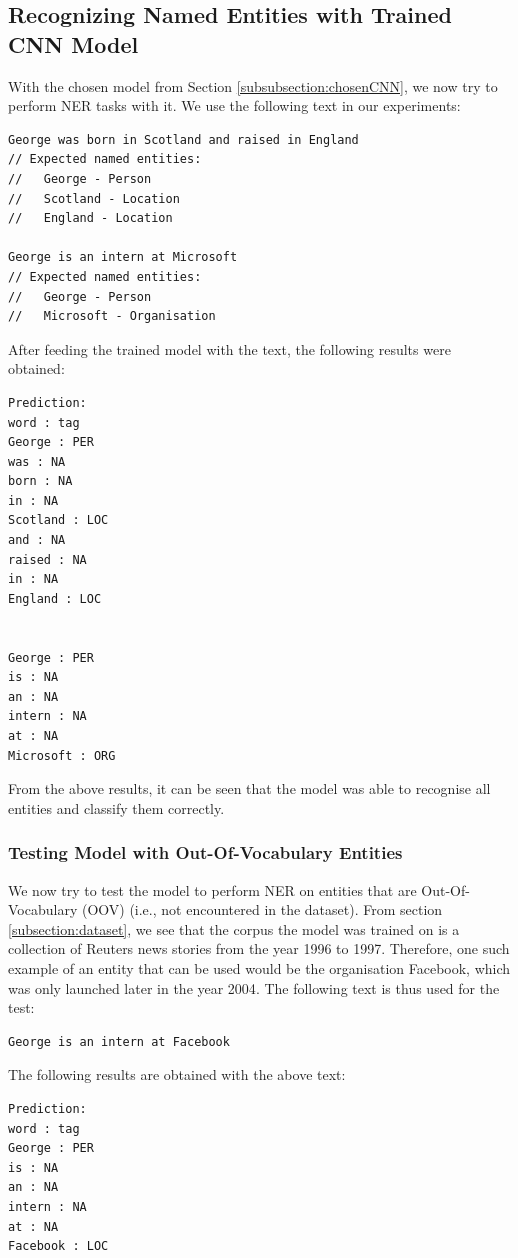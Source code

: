 \documentclass[sigconf,nonacm=true]{acmart}
\begin{document}
\subsection{Recognizing Named Entities with Trained CNN Model}
With the chosen model from Section \ref{subsubsection:chosenCNN}, we now try to perform NER tasks with it. We use the following text in our experiments:

\begin{lstlisting}
George was born in Scotland and raised in England
// Expected named entities: 
//   George - Person
//   Scotland - Location
//   England - Location

George is an intern at Microsoft
// Expected named entities:
//   George - Person
//   Microsoft - Organisation
\end{lstlisting}

After feeding the trained model with the text, the following results were obtained:
\begin{lstlisting}
Prediction:
word : tag
George : PER
was : NA
born : NA
in : NA
Scotland : LOC
and : NA
raised : NA
in : NA
England : LOC


George : PER
is : NA
an : NA
intern : NA
at : NA
Microsoft : ORG
\end{lstlisting}

From the above results, it can be seen that the model was able to recognise all entities and classify them correctly. 

\subsubsection{Testing Model with Out-Of-Vocabulary Entities}
We now try to test the model to perform NER on entities that are Out-Of-Vocabulary (OOV) (i.e., not encountered in the dataset). From section \ref{subsection:dataset}, we see that the corpus the model was trained on is a collection of Reuters news stories from the year 1996 to 1997. Therefore, one such example of an entity that can be used would be the organisation Facebook, which was only launched later in the year 2004\cite{rothman_2015}. The following text is thus used for the test:

\begin{lstlisting}
George is an intern at Facebook
\end{lstlisting}

The following results are obtained with the above text:

\begin{lstlisting}
Prediction:
word : tag
George : PER
is : NA
an : NA
intern : NA
at : NA
Facebook : LOC
\end{lstlisting}
\end{document}
